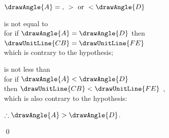\documentclass[booklanguage=english]{byrnebook}
\begin{document}
\begin{center}
$\drawAngle{A} =\mbox{, } > \mbox{ or } < \drawAngle{D}$

 is not equal to \\
for if $\drawAngle{A} = \drawAngle{D}$ then $\drawUnitLine{CB} = \drawUnitLine{FE}$ \\
which is contrary to the hypothesis;

 is not less than \\
for if $\drawAngle{A} < \drawAngle{D}$\\
then $\drawUnitLine{CB} < \drawUnitLine{FE}$ ,\\
which is also contrary to the hypothesis:

$\therefore \drawAngle{A} > \drawAngle{D}$.
\end{center}

\qed
\end{document}
